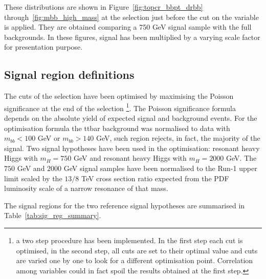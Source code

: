 These distributions are shown in Figure~\ref{fig:topcr_bbpt_drbb} through~\ref{fig:mbb_high_mass} at the selection just before the cut on the variable is applied. They are obtained comparing a 750 GeV
signal sample with the full backgrounds. In these figures, signal has been multiplied by a varying scale factor for presentation purpose.  

\subsection{Signal region definitions}
\label{subsec:SR}
The cuts of the selection have been optimised by maximising the Poisson
significance at the end of the selection \footnote{a two step procedure has
been implemented. In the first step each cut is optimised, in the second step,
all cuts are set to their optimal value and cuts are varied one by one to
look for a different optimisation point. Correlation among variables 
could in fact spoil the results obtained at the first step.}. The Poisson
significance formula depends on the absolute yield of expected signal and
background events. For the optimisation formula the ttbar background was
normalised to data with $m_{bb} < 100$ GeV or $m_{bb} > 140$ GeV, 
such region rejects, in fact, the majority of the signal. Two signal
hypotheses have been used in the optimisation: resonant
heavy Higgs with $m_H = 750$ GeV and resonant heavy Higgs with $m_H = 2000$ GeV.
The $750$ GeV and $2000$ GeV signal samples have been normalised to the Run-1 upper limit scaled by the $13/8$ TeV cross section ratio expected from the
PDF luminosity scale of a narrow resonance of that mass. 

The signal regions for the two  reference signal hypotheses are summarised in 
Table~\ref{tab:sig_reg_summary}.


